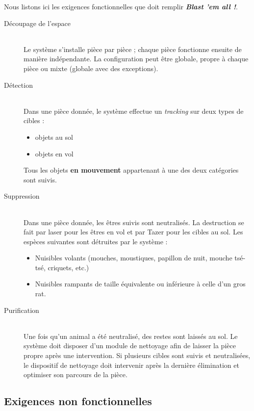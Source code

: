 Nous listons ici les exigences fonctionnelles que doit remplir 
\textit{\textbf{Blast 'em all !}}.
\begin{description}
\item[Découpage de l'espace]\hfill\\
Le système s'installe pièce par pièce ; chaque pièce fonctionne ensuite de
manière indépendante. La configuration peut être globale, propre à chaque
pièce ou mixte (globale avec des exceptions).

\item[Détection]\hfill\\
Dans une pièce donnée, le système effectue un {\sl tracking} sur deux types de
cibles :
    \begin{itemize}
    \item objets au sol
    \item objets en vol
    \end{itemize}
    \vskip 6pt
Tous les objets	\textbf{en mouvement} appartenant à une des deux catégories sont
suivis. 

\item[Suppression]\hfill\\
Dans une pièce donnée, les êtres suivis sont neutralisés. La destruction 
se fait par laser pour les êtres en vol et par Tazer pour les cibles au
sol. Les espèces suivantes sont détruites par le système :
    \begin{itemize}
    \item Nuisibles volants (mouches, moustiques, papillon de nuit, mouche
    tsé-tsé, criquets, etc.)
    \item Nuisibles rampants de taille équivalente ou inférieure à celle
    d'un gros rat.
    \end{itemize}
    \vskip 6pt

\item[Purification]\hfill\\
Une fois qu'un animal a été neutralisé, des restes sont laissés au sol. Le
système doit disposer d'un module de nettoyage afin de laisser la pièce
propre après une intervention. Si plusieurs cibles sont suivis et
neutralisées, le dispositif de nettoyage doit intervenir après la dernière
élimination et optimiser son parcours de la pièce.
\end{description}

\subsection{Exigences non fonctionnelles}

